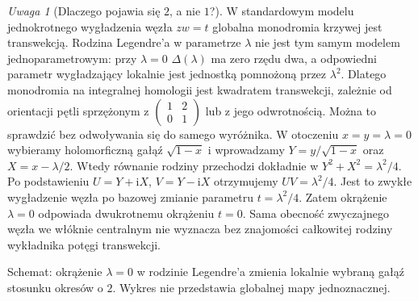 \documentclass[11pt,a4paper,oneside]{report}
\theoremstyle{plain}
\theoremstyle{definition}
\theoremstyle{remark}
\newtheorem{uwaga}[twierdzenie]{Uwaga}
\begin{document}
\begin{uwaga}[Dlaczego pojawia się $2$, a nie $1$?]
W standardowym modelu jednokrotnego wygładzenia węzła
$zw=t$ globalna monodromia krzywej jest transwekcją.
Rodzina Legendre'a w parametrze $\lambda$ nie jest tym samym
modelem jednoparametrowym: przy $\lambda=0$
$\Delta(\lambda)$ ma zero rzędu dwa, a odpowiedni
parametr wygładzający lokalnie jest jednostką pomnożoną
przez $\lambda^2$. Dlatego monodromia na integralnej
homologii jest kwadratem transwekcji,
zależnie od orientacji pętli sprzężonym z
$\left(\begin{smallmatrix}1&2\\0&1\end{smallmatrix}\right)$
lub z jego odwrotnością.
Można to sprawdzić bez odwoływania się do samego
wyróżnika. W otoczeniu $x=y=\lambda=0$ wybieramy
holomorficzną gałąź $\sqrt{1-x}$ i wprowadzamy
$Y=y/\sqrt{1-x}$ oraz $X=x-\lambda/2$.
Wtedy równanie rodziny przechodzi dokładnie w
$Y^2+X^2=\lambda^2/4$.
Po podstawieniu $U=Y+\mathrm iX$, $V=Y-\mathrm iX$
otrzymujemy $UV=\lambda^2/4$. Jest to zwykłe
wygładzenie węzła po bazowej zmianie parametru
$t=\lambda^2/4$. Zatem okrążenie $\lambda=0$
odpowiada dwukrotnemu okrążeniu $t=0$.
Sama obecność zwyczajnego węzła we włóknie
centralnym nie wyznacza bez znajomości całkowitej
rodziny wykładnika potęgi transwekcji.
\end{uwaga}

\begin{center}
\par\smallskip\small Schemat: okrążenie $\lambda=0$ w rodzinie Legendre'a
zmienia lokalnie wybraną gałąź stosunku okresów o $2$.
Wykres nie przedstawia globalnej mapy jednoznacznej.
\end{center}
\end{document}

